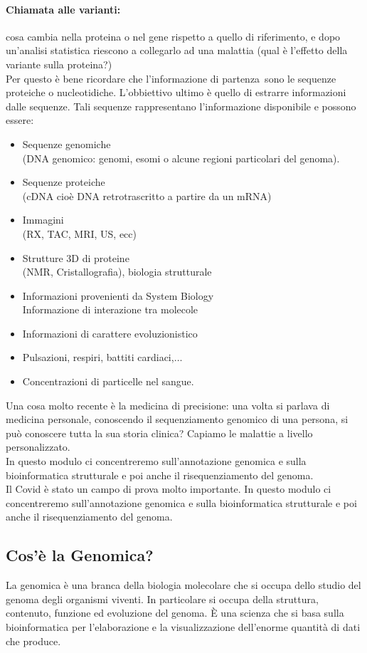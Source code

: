 \documentclass{article}
\begin{document}
\paragraph{Chiamata alle varianti:} cosa cambia nella proteina o nel gene rispetto a quello di riferimento, e dopo un'analisi statistica riescono a collegarlo ad una malattia (qual è l'effetto della variante sulla proteina?)\\
Per questo è bene ricordare che l'informazione di partenza sono le sequenze proteiche o nucleotidiche. L'obbiettivo ultimo è quello di estrarre informazioni dalle sequenze. Tali sequenze rappresentano l'informazione disponibile e possono essere:
\begin{itemize}
    \item Sequenze genomiche\\  (DNA genomico: genomi, esomi o alcune regioni particolari del genoma).
    \item Sequenze proteiche\\ (cDNA cioè DNA retrotrascritto a partire da un mRNA)
    \item Immagini\\ (RX, TAC, MRI, US, ecc)
    \item Strutture 3D di proteine\\ (NMR, Cristallografia), biologia strutturale
    \item Informazioni provenienti da System Biology \\ Informazione di interazione tra molecole
    \item Informazioni di carattere evoluzionistico
    \item Pulsazioni, respiri, battiti cardiaci,$ \dots $
    \item Concentrazioni di particelle nel sangue.
\end{itemize}
Una cosa molto recente è la medicina di precisione: una volta si parlava di medicina personale, conoscendo il sequenziamento genomico di una persona, si può conoscere tutta la sua storia clinica? Capiamo le malattie a livello personalizzato.\\
In questo modulo ci concentreremo sull'annotazione genomica e sulla bioinformatica strutturale e poi anche il risequenziamento del genoma.\\
Il Covid è stato un campo di prova molto importante. In questo modulo ci concentreremo sull'annotazione genomica e sulla bioinformatica strutturale e poi anche il risequenziamento del genoma.

\subsection{Cos'è la Genomica?}
La genomica è una branca della biologia molecolare che si occupa dello studio
del genoma degli organismi viventi. In particolare si occupa della struttura,
contenuto, funzione ed evoluzione del genoma. È una scienza che si basa
sulla bioinformatica per l'elaborazione e la visualizzazione dell'enorme quantità di
dati che produce.
\end{document}
